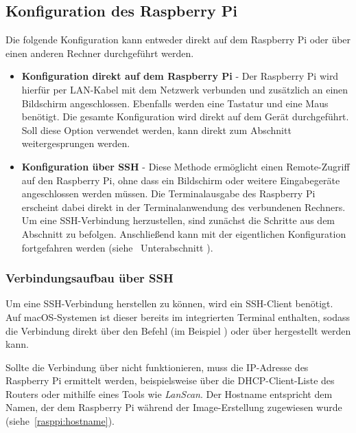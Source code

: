 \subsection{Konfiguration des Raspberry Pi}

Die folgende Konfiguration kann entweder direkt auf dem Raspberry Pi oder über einen anderen Rechner durchgeführt werden.

\begin{itemize}
	\item \textbf{Konfiguration direkt auf dem Raspberry Pi} - Der Raspberry Pi wird hierfür per LAN-Kabel mit dem Netzwerk verbunden und zusätzlich an einen Bildschirm angeschlossen. Ebenfalls werden eine Tastatur und eine Maus benötigt. Die gesamte Konfiguration wird direkt auf dem Gerät durchgeführt. Soll diese Option verwendet werden, kann direkt zum Abschnitt  weitergesprungen werden.
	
	\item \textbf{Konfiguration über SSH} - Diese Methode ermöglicht einen Remote-Zugriff auf den Raspberry Pi, ohne dass ein Bildschirm oder weitere Eingabegeräte angeschlossen werden müssen. Die Terminalausgabe des Raspberry Pi erscheint dabei direkt in der Terminalanwendung des verbundenen Rechners. Um eine SSH-Verbindung herzustellen, sind zunächst die Schritte aus dem Abschnitt  zu befolgen. Anschlie{\ss}end kann mit der eigentlichen Konfiguration fortgefahren werden (siehe~ Unterabschnitt ).
	
	
	\end{itemize}
	
	\subsubsection{Verbindungsaufbau über SSH \label{rasppi:sshConfig}}
	
	Um eine SSH-Verbindung herstellen zu können, wird ein SSH-Client benötigt. 
	Auf macOS-Systemen ist dieser bereits im integrierten Terminal enthalten, sodass die Verbindung direkt über den Befehl  
	 (im Beispiel )  
	oder über  
	hergestellt werden kann.
	
	
	Sollte die Verbindung über  nicht funktionieren, muss die IP-Adresse des Raspberry Pi ermittelt werden, beispielsweise über die DHCP-Client-Liste des Routers oder mithilfe eines Tools wie \textit{LanScan}.  
	Der Hostname entspricht dem Namen, der dem Raspberry Pi während der Image-Erstellung zugewiesen wurde (siehe~\autoref{rasppi:hostname}).
	
